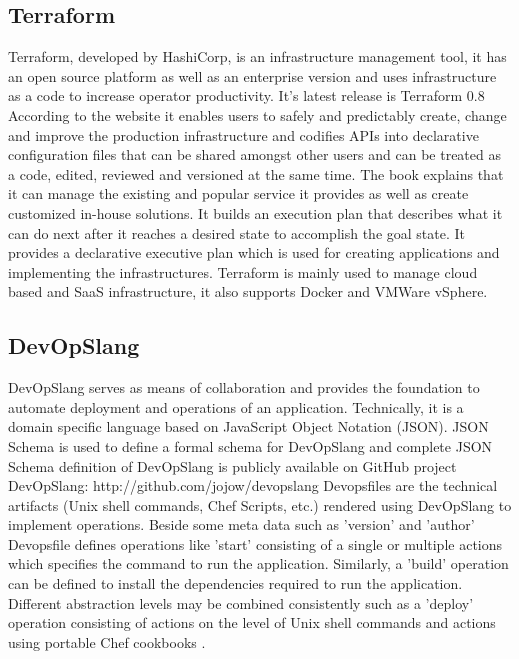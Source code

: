{\subsection{Terraform \cv}

     Terraform, developed by HashiCorp, is an infrastructure
     management tool, it has an open source platform as well as an
     enterprise version and uses infrastructure as a code to increase
     operator productivity. It’s latest release is Terraform 0.8
     According to the website \cite{www-Terraform} it enables users
     to safely and predictably create, change and improve the
     production infrastructure and codifies APIs into declarative
     configuration files that can be shared amongst other users and
     can be treated as a code, edited, reviewed and versioned at the
     same time. The book \cite{www-terraform-book} explains that it
     can manage the existing and popular service it provides as well
     as create customized in-house solutions. It builds an execution
     plan that describes what it can do next after it reaches a
     desired state to accomplish the goal state. It provides a
     declarative executive plan which is used for creating
     applications and implementing the infrastructures. Terraform is
     mainly used to manage cloud based and SaaS infrastructure, it
     also supports Docker and VMWare vSphere.
     
\subsection{DevOpSlang}
     
     DevOpSlang serves as means of collaboration and provides the
     foundation to automate deployment and operations of an
     application. Technically, it is a domain specific language based
     on JavaScript Object Notation (JSON). JSON Schema is used to
     define a formal schema for DevOpSlang and complete JSON Schema
     definition of DevOpSlang is publicly available on GitHub project
     DevOpSlang: http://github.com/jojow/devopslang Devopsfiles are
     the technical artifacts (Unix shell commands, Chef Scripts, etc.)
     rendered using DevOpSlang to implement operations.  Beside some
     meta data such as ’version’ and ’author’ Devopsfile defines
     operations like ’start’ consisting of a single or multiple
     actions which specifies the command to run the
     application. Similarly, a ’build’ operation can be defined to
     install the dependencies required to run the
     application. Different abstraction levels may be combined
     consistently such as a ’deploy’ operation consisting of actions
     on the level of Unix shell commands and actions using portable
     Chef cookbooks \cite{DevOpSlang}.

}
